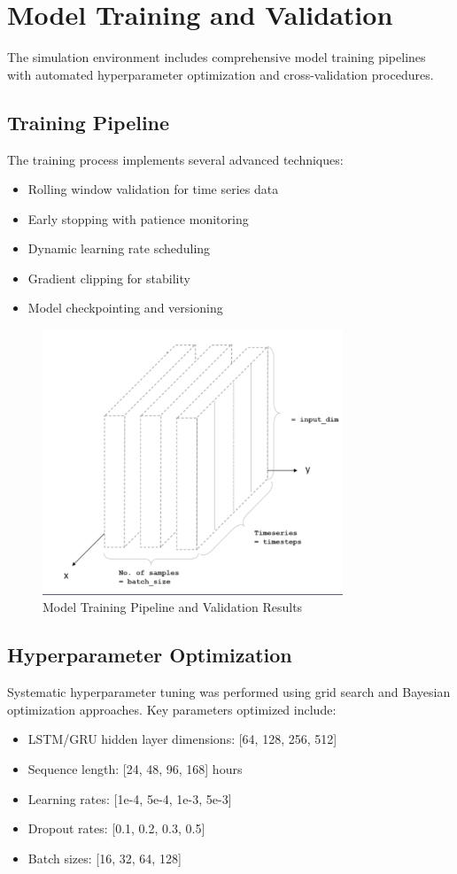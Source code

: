 \documentclass[12pt,a4paper]{report}
\begin{document}
\section{Model Training and Validation}
The simulation environment includes comprehensive model training pipelines with automated hyperparameter optimization and cross-validation procedures.

\subsection{Training Pipeline}
The training process implements several advanced techniques:
\begin{itemize}
\item Rolling window validation for time series data
\item Early stopping with patience monitoring
\item Dynamic learning rate scheduling
\item Gradient clipping for stability
\item Model checkpointing and versioning
\end{itemize}

\begin{figure}[H]
    \centering
    \includegraphics[width=0.8\textwidth]{3.png}
    \caption{Model Training Pipeline and Validation Results}
    \label{fig:training_pipeline}
\end{figure}

\subsection{Hyperparameter Optimization}
Systematic hyperparameter tuning was performed using grid search and Bayesian optimization approaches. Key parameters optimized include:
\begin{itemize}
\item LSTM/GRU hidden layer dimensions: [64, 128, 256, 512]
\item Sequence length: [24, 48, 96, 168] hours
\item Learning rates: [1e-4, 5e-4, 1e-3, 5e-3]
\item Dropout rates: [0.1, 0.2, 0.3, 0.5]
\item Batch sizes: [16, 32, 64, 128]
\end{itemize}
\end{document}
